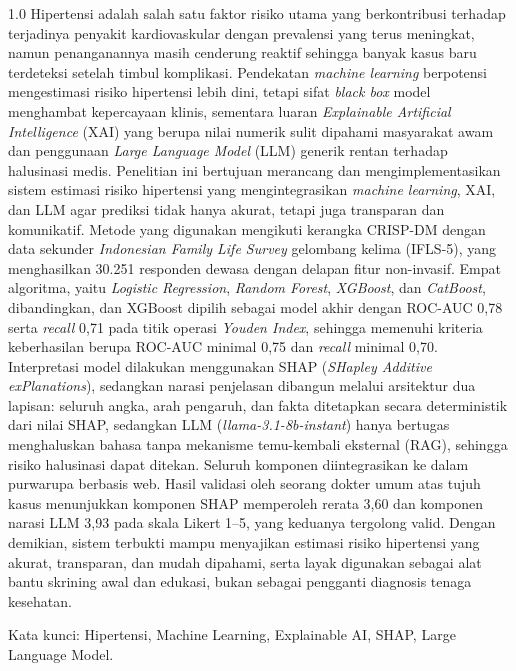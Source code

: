\begin{spacing}{1.0}
Hipertensi adalah salah satu faktor risiko utama yang berkontribusi terhadap terjadinya penyakit kardiovaskular dengan
prevalensi yang terus meningkat, namun penanganannya masih cenderung reaktif sehingga
banyak kasus baru terdeteksi setelah timbul komplikasi. Pendekatan \textit{machine
learning} berpotensi mengestimasi risiko hipertensi lebih dini, tetapi sifat \textit{black
box} model menghambat kepercayaan klinis, sementara luaran \textit{Explainable Artificial
Intelligence} (XAI) yang berupa nilai numerik sulit dipahami masyarakat awam dan penggunaan
\textit{Large Language Model} (LLM) generik rentan terhadap halusinasi medis. Penelitian ini
bertujuan merancang dan mengimplementasikan sistem estimasi risiko hipertensi yang
mengintegrasikan \textit{machine learning}, XAI, dan LLM agar prediksi tidak hanya akurat,
tetapi juga transparan dan komunikatif. Metode yang digunakan mengikuti kerangka CRISP-DM
dengan data sekunder \textit{Indonesian Family Life Survey} gelombang kelima (IFLS-5), yang
menghasilkan 30.251 responden dewasa dengan delapan fitur non-invasif. Empat algoritma, yaitu
\textit{Logistic Regression}, \textit{Random Forest}, \textit{XGBoost}, dan \textit{CatBoost},
dibandingkan, dan XGBoost dipilih sebagai model akhir dengan ROC-AUC 0,78 serta \textit{recall}
0,71 pada titik operasi \textit{Youden Index}, sehingga memenuhi kriteria keberhasilan berupa
ROC-AUC minimal 0,75 dan \textit{recall} minimal 0,70. Interpretasi model dilakukan menggunakan
SHAP (\textit{SHapley Additive exPlanations}), sedangkan narasi penjelasan dibangun melalui
arsitektur dua lapisan: seluruh angka, arah pengaruh, dan fakta ditetapkan secara deterministik
dari nilai SHAP, sedangkan LLM (\textit{llama-3.1-8b-instant}) hanya bertugas menghaluskan bahasa
tanpa mekanisme temu-kembali eksternal (RAG), sehingga risiko halusinasi dapat ditekan. Seluruh
komponen diintegrasikan ke dalam purwarupa berbasis web. Hasil validasi oleh seorang dokter umum
atas tujuh kasus menunjukkan komponen SHAP memperoleh rerata 3,60 dan komponen narasi LLM 3,93
pada skala Likert 1--5, yang keduanya tergolong valid. Dengan demikian, sistem terbukti mampu
menyajikan estimasi risiko hipertensi yang akurat, transparan, dan mudah dipahami, serta layak
digunakan sebagai alat bantu skrining awal dan edukasi, bukan sebagai pengganti diagnosis tenaga
kesehatan.

Kata kunci: Hipertensi, Machine Learning, Explainable AI, SHAP, Large Language Model.
\end{spacing}
